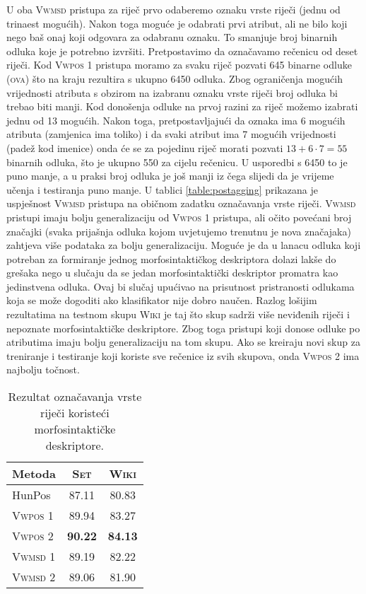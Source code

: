 U oba \textsc{Vwmsd} pristupa za riječ prvo odaberemo oznaku vrste riječi (jednu
od trinaest mogućih). Nakon toga moguće je odabrati prvi atribut, ali ne bilo
koji nego baš onaj koji odgovara za odabranu oznaku. To smanjuje broj binarnih
odluka koje je potrebno izvršiti. Pretpostavimo da označavamo rečenicu od deset
riječi. Kod \textsc{Vwpos 1} pristupa moramo za svaku riječ pozvati 645 binarne
odluke (\textsc{ova}) što na kraju rezultira s ukupno 6450 odluka. Zbog
ograničenja mogućih vrijednosti atributa s obzirom na izabranu oznaku vrste
riječi broj odluka bi trebao biti manji. Kod donošenja odluke na prvoj razini za
riječ možemo izabrati jednu od 13 mogućih. Nakon toga, pretpostavljajući da
oznaka ima 6 mogućih atributa (zamjenica ima toliko) i da svaki atribut ima 7
mogućih vrijednosti (padež kod imenice) onda će se za pojedinu riječ morati
pozvati $13+6 \cdot 7 = 55$ binarnih odluka, što je ukupno 550 za cijelu
rečenicu. U usporedbi s 6450 to je puno manje, a u praksi broj odluka je još
manji iz čega slijedi da je vrijeme učenja i testiranja puno manje. U tablici
\ref{table:postagging} prikazana je uspješnost \textsc{Vwmsd} pristupa na
običnom zadatku označavanja vrste riječi. \textsc{Vwmsd} pristupi imaju bolju
generalizaciju od \textsc{Vwpos 1} pristupa, ali očito povećani broj značajki
(svaka prijašnja odluka kojom uvjetujemo trenutnu je nova značajaka) zahtjeva
više podataka za bolju generalizaciju. Moguće je da u lanacu odluka koji
potreban za formiranje jednog morfosintaktičkog deskriptora dolazi lakše do
grešaka nego u slučaju da se jedan morfosintaktički deskriptor promatra kao
jedinstvena odluka. Ovaj bi slučaj upućivao na prisutnost pristranosti odlukama
koja se može dogoditi ako klasifikator nije dobro naučen. Razlog lošijim
rezultatima na testnom skupu \textsc{Wiki} je taj što skup sadrži više neviđenih
riječi i nepoznate morfosintaktičke deskriptore. Zbog toga pristupi koji donose
odluke po atributima imaju bolju generalizaciju na tom skupu. Ako se kreiraju
novi skup za treniranje i testiranje koji koriste sve rečenice iz svih skupova,
onda \textsc{Vwpos 2} ima najbolju točnost.

\begin{table}
\centering
\caption{Rezultat označavanja vrste riječi koristeći morfosintaktičke
deskriptore.}
\label{table:msdtagging}
\begin{tabular}{|l|c|c|}
\hline
Metoda             & \textsc{Set}   & \textsc{Wiki}  \\ \hline \hline
HunPos             & 87.11          & 80.83          \\
\textsc{Vwpos 1}   & 89.94          & 83.27          \\
\textsc{Vwpos 2}   & \textbf{90.22} & \textbf{84.13} \\
\textsc{Vwmsd 1}   & 89.19          & 82.22          \\
\textsc{Vwmsd 2}   & 89.06          & 81.90          \\ \hline
\end{tabular}
\end{table}
